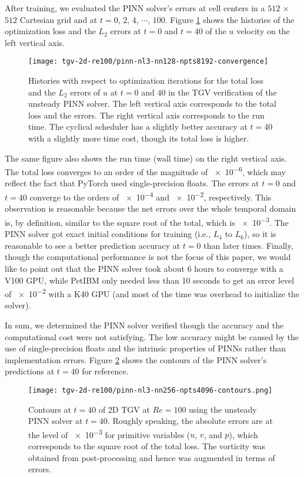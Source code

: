 After training, we evaluated the PINN solver's errors at cell centers in a $512$ $\times$ $512$ Cartesian grid and at $t=0$, $2$, $4$, $\cdots$, $100$.
Figure \ref{fig:tgv-pinn-loss} shows the histories of the optimization loss and the $L_2$ errors at $t=0$ and $t=40$ of the $u$ velocity on the left vertical axis.
\begin{figure}
    \centering%
    \texttt{[image: tgv-2d-re100/pinn-nl3-nn128-npts8192-convergence]}%
    \caption{%
        Histories with respect to optimization iterations for the total loss and the $L_2$ errors of $u$ at $t=0$ and $40$ in the TGV verification of the unsteady PINN solver.
        The left vertical axis corresponds to the total loss and the errors.
        The right vertical axis corresponds to the run time.
        The cyclical scheduler has a slightly better accuracy at $t=40$ with a slightly more time cost, though its total loss is higher.
    }
    \label{fig:tgv-pinn-loss}%
\end{figure}
The same figure also shows the run time (wall time) on the right vertical axis.
The total loss converges to an order of the magnitude of \num{e-6}, which may reflect the fact that PyTorch used single-precision floats.
The errors at $t=0$ and $t=40$ converge to the orders of \num{e-4} and \num{e-2}, respectively.
This observation is reasonable because the net errors over the whole temporal domain is, by definition, similar to the square root of the total, which is \num{e-3}.
The PINN solver got exact initial conditions for training (i.e., $L_4$ to $L_6$), so it is reasonable to see a better prediction accuracy at $t=0$ than later times.
Finally, though the computational performance is not the focus of this paper, we would like to point out that the PINN solver took about 6 hours to converge with a V100 GPU, while PetIBM only needed less than 10 seconds to get an error level of \num{e-2} with a K40 GPU (and most of the time was overhead to initialize the solver).

In sum, we determined the PINN solver verified though the accuracy and the computational cost were not satisfying.
The low accuracy might be caused by the use of single-precision floats and the intrinsic properties of PINNs rather than implementation errors.
Figure \ref{fig:tgv-pinn-contours} shows the contours of the PINN solver's predictions at $t=40$ for reference.
\begin{figure}
    \centering%
    \texttt{[image: tgv-2d-re100/pinn-nl3-nn256-npts4096-contours.png]}
    \caption{%
        Contours at $t=40$ of 2D TGV at $Re=\num{100}$ using the unsteady PINN solver at $t=40$.
        Roughly speaking, the absolute errors are at the level of \num{e-3} for primitive variables ($u$, $v$, and $p$), which corresponds to the square root of the total loss.
        The vorticity was obtained from post-processing and hence was augmented in terms of errors.
    }
    \label{fig:tgv-pinn-contours}%
\end{figure}

